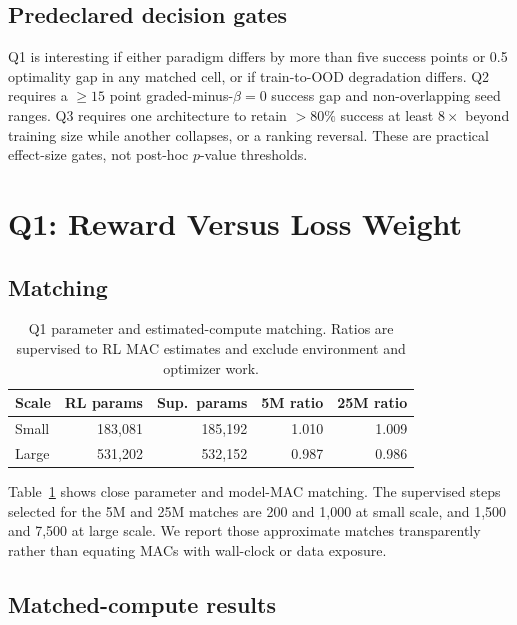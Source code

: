 \documentclass[10pt,twocolumn]{article}
\begin{document}
\subsection{Predeclared decision gates}

Q1 is interesting if either paradigm differs by more than five success points
or 0.5 optimality gap in any matched cell, or if train-to-OOD degradation
differs.  Q2 requires a $\geq15$ point graded-minus-$\beta{=}0$ success gap and
non-overlapping seed ranges.  Q3 requires one architecture to retain
$>80\%$ success at least $8\times$ beyond training size while another collapses,
or a ranking reversal.  These are practical effect-size gates, not post-hoc
$p$-value thresholds.

\section{Q1: Reward Versus Loss Weight}
\label{sec:q1}

\subsection{Matching}

\begin{table}[t]
\centering
\caption{Q1 parameter and estimated-compute matching.  Ratios are supervised
to RL MAC estimates and exclude environment and optimizer work.}
\label{tab:match}
\small
\begin{tabular}{@{}lrrrr@{}}
\toprule
Scale & RL params & Sup.\ params & 5M ratio & 25M ratio\\
\midrule
Small & 183,081 & 185,192 & 1.010 & 1.009\\
Large & 531,202 & 532,152 & 0.987 & 0.986\\
\bottomrule
\end{tabular}
\end{table}

Table~\ref{tab:match} shows close parameter and model-MAC matching.  The supervised
steps selected for the 5M and 25M matches are 200 and 1,000 at small scale,
and 1,500 and 7,500 at large scale.  We report those approximate matches
transparently rather than equating MACs with wall-clock or data exposure.

\subsection{Matched-compute results}
\end{document}
